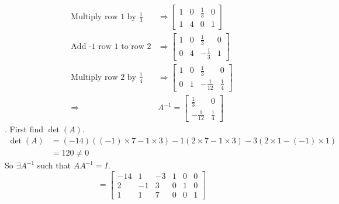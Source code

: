 \documentclass[11pt]{homework}
\begin{document}
\begin{align*}
\text{Multiply row 1 by $\frac{1}{3}$}
  &\Rightarrow
    \left[
    \begin{array}{cc|cc}
      1 & 0 & \frac{1}{3} & 0 \\
      1 & 4 & 0 & 1
    \end{array}  
    \right] \\
\text{Add -1 row 1 to row 2}
  &\Rightarrow
    \left[
    \begin{array}{cc|cc}
    1 & 0 & \frac{1}{3} & 0 \\
    0 & 4 & -\frac{1}{3} & 1
    \end{array} 
    \right] \\
\text{Multiply row 2 by $\frac{1}{4}$}
  &\Rightarrow 
    \left[
    \begin{array}{cc|cc}
    1 & 0 & \frac{1}{3} & 0 \\
    0 & 1 & -\frac{1}{12} & \frac{1}{4}
    \end{array} 
    \right] \\
\Rightarrow 
&A^{-1} = 
  \begin{bmatrix}
  \frac{1}{3} & 0 \\
  -\frac{1}{12} & \frac{1}{4}
  \end{bmatrix}
\end{align*}
. First find $\det(A)$.
\begin{align*}
  \det(A) &= (-14)((-1)\times 7 - 1 \times 3)
           -    1 ( 2  \times 7 - 1 \times 3)
           -    3 ( 2  \times 1 - (-1) \times 1) \\
          &= 120 \neq 0
\end{align*}
So $\exists A^{-1}$ such that $AA^{-1} = I$.
\begin{equation*}
[A|I] = 
  \left[
  \begin{array}{ccc|ccc}
  -14 & 1 & -3 & 1 & 0 & 0 \\
  2  & -1 & 3 & 0 & 1 & 0 \\
  1 & 1 & 7 & 0 & 0 & 1
  \end{array}
  \right]
\end{equation*}
\end{document}
